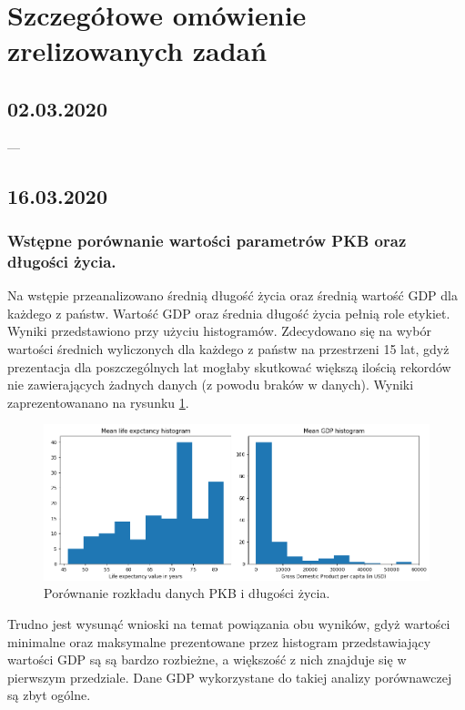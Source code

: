 \documentclass{article}
\begin{document}
\clearpage
\section{Szczegółowe omówienie zrelizowanych zadań}

\subsection{02.03.2020}
  
  ---
  
\subsection{16.03.2020} 
  
\subsubsection{Wstępne porównanie wartości parametrów PKB oraz długości życia.}

Na wstępie przeanalizowano średnią długość życia oraz średnią wartość GDP dla każdego z państw.
Wartość GDP oraz średnia długość życia pełnią role etykiet.
Wyniki przedstawiono przy użyciu histogramów. Zdecydowano się na wybór wartości średnich wyliczonych dla każdego z państw na przestrzeni 15 lat,
gdyż prezentacja dla poszczególnych lat mogłaby skutkować większą ilością rekordów nie zawierających żadnych danych (z powodu braków w danych).
Wyniki zaprezentowanano na rysunku \ref{fig:1_1_GDP_vs_LE}.

\begin{figure}[h!]
\begin{center}
\includegraphics[width=5 in]{Pictures/1_GDP_vs_LE.png}
\end{center}
\captionsetup{justification=centering}
\caption{Porównanie rozkładu danych PKB i długości życia.}
\label{fig:1_1_GDP_vs_LE}
\end{figure}
  
Trudno jest wysunąć wnioski na temat powiązania obu wyników, gdyż wartości minimalne oraz maksymalne prezentowane przez histogram przedstawiający wartości GDP są są bardzo rozbieżne, a większość z nich
znajduje się w pierwszym przedziale. Dane GDP wykorzystane do takiej analizy porównawczej są zbyt ogólne.
 
\end{document}
